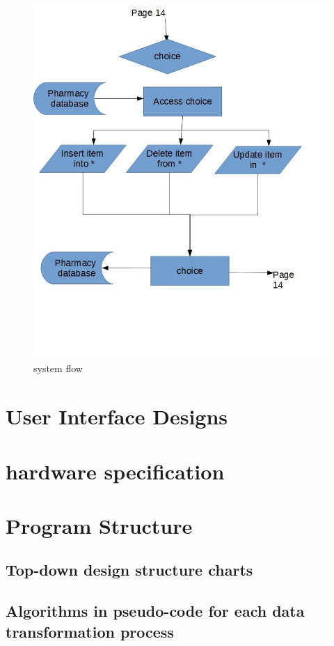 \begin{figure}[H]
\centering
\includegraphics[width=140mm, scale=2]{system flow 2.JPG}
\caption{system flow \label{overflow}}
\end{figure}
\section{User Interface Designs}

\section{hardware specification}

\section{Program Structure}

\subsection{Top-down design structure charts}

\subsection{Algorithms in pseudo-code for each data transformation process}

